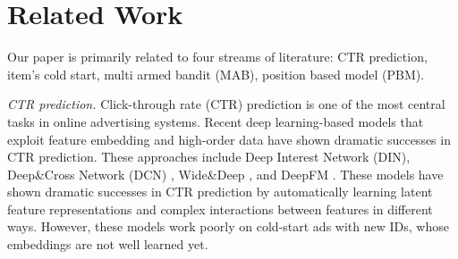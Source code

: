 \section{Related Work}
Our paper is primarily related to four streams of literature: CTR prediction, item's cold start, multi armed bandit (MAB), position based model (PBM).

\textit{CTR prediction.} Click-through rate (CTR) prediction is one of the most central tasks in online advertising systems. Recent deep learning-based models that exploit feature embedding and high-order data have shown dramatic successes in CTR prediction. These approaches include Deep Interest Network (DIN)\cite{zhou2018deep}, Deep\&Cross Network  (DCN) \cite{wang2017deep}, Wide\&Deep \cite{cheng2016wide}, and DeepFM \cite{guo2017deepfm}. These models have shown dramatic successes in CTR prediction by automatically learning latent feature representations and complex interactions between features in different ways. However, these models work poorly on cold-start ads with new IDs, whose embeddings are not well learned yet.

